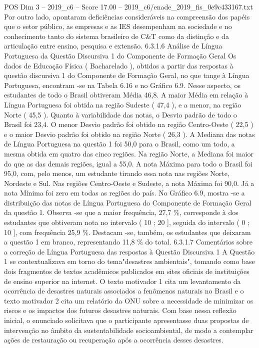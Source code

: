 \begin{textsample}{POS Dim 3 – 2019\_c6 – Score 17.00 – 2019\_c6/enade\_2019\_fis\_0e9c433167.txt}
Por outro lado, apontaram deficiências consideráveis na compreensão dos papéis que o setor público, as empresas e as IES desempenham na sociedade e no conhecimento tanto do sistema brasileiro de C\&T como da distinção e da articulação entre ensino, pesquisa e extensão. 6.3.1.6 Análise de Língua Portuguesa da Questão Discursiva 1 do Componente de Formação Geral Os dados de Educação Física ( Bacharelado ), obtidos a partir das respostas à questão discursiva 1 do Componente de Formação Geral, no que tange à Língua Portuguesa, encontram -se na Tabela 6.16 e no Gráfico 6.9.
Nesse aspecto, os estudantes de todo o Brasil obtiveram Média 46,8.
A maior Média em relação à Língua Portuguesa foi obtida na região Sudeste ( 47,4 ), e a menor, na região Norte ( 45,5 ).
Quanto à variabilidade das notas, o Desvio padrão de todo o Brasil foi 23,4.
O menor Desvio padrão foi obtido na região Centro-Oeste ( 22,5 ) e o maior Desvio padrão foi obtido na região Norte ( 26,3 ).
A Mediana das notas de Língua Portuguesa na questão 1 foi 50,0 para o Brasil, como um todo, a mesma obtida em quatro das cinco regiões.
Na região Norte, a Mediana foi maior do que as das demais regiões, igual a 55,0.
A nota Máxima para todo o Brasil foi 95,0, com, pelo menos, um estudante tirando essa nota nas regiões Norte, Nordeste e Sul.
Nas regiões Centro-Oeste e Sudeste, a nota Máxima foi 90,0.
Já a nota Mínima foi zero em todas as regiões do país.
No Gráfico 6.9, mostra -se a distribuição das notas de Língua Portuguesa do Componente de Formação Geral da questão 1.
Observa -se que a maior frequência, 27,7 \%, corresponde à dos estudantes que obtiveram nota no intervalo ( 10 ; 20 ], seguida do intervalo ( 0 ; 10 ], com frequência 25,9 \%.
Destacam -se, também, os estudantes que deixaram a questão 1 em branco, representando 11,8 \% do total. 6.3.1.7 Comentários sobre a correção de Língua Portuguesa das respostas à Questão Discursiva 1 A Questão 1 se contextualizava em torno do tema"desastres ambientais", tomando como base dois fragmentos de textos acadêmicos publicados em sites oficiais de instituições de ensino superior na internet.
O texto motivador 1 cita um levantamento da ocorrência de desastres naturais associados a fenômenos naturais no Brasil e o texto motivador 2 cita um relatório da ONU sobre a necessidade de minimizar os riscos e os impactos dos futuros desastres naturais.
Com base nessa reflexão inicial, o enunciado solicitava que o participante apresentasse duas propostas de intervenção no âmbito da sustentabilidade socioambiental, de modo a contemplar ações de restauração ou recuperação após a ocorrência desses desastres.

\end{textsample}
